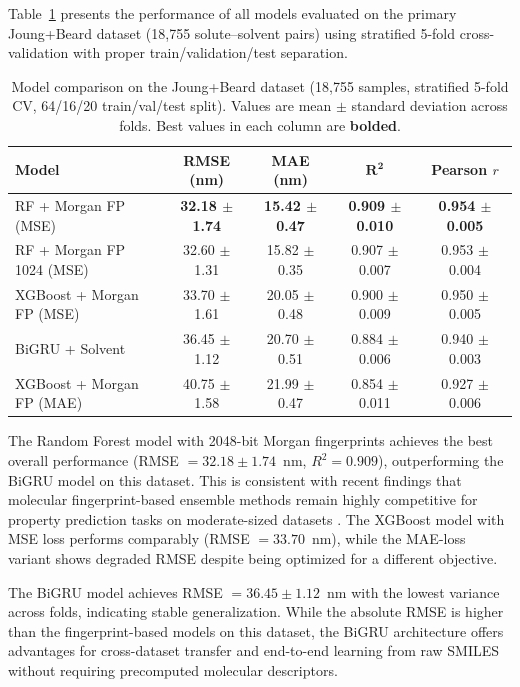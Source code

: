 \documentclass[11pt,a4paper]{article}
\begin{document}
Table~\ref{tab:model_comparison} presents the performance of all models evaluated on the primary Joung+Beard dataset (18,755 solute--solvent pairs) using stratified 5-fold cross-validation with proper train/validation/test separation.

\begin{table}[H]
\centering
\caption{Model comparison on the Joung+Beard dataset (18,755 samples, stratified 5-fold CV, 64/16/20 train/val/test split). Values are mean $\pm$ standard deviation across folds. Best values in each column are \textbf{bolded}.}
\label{tab:model_comparison}
\begin{tabular}{lcccc}
\toprule
\textbf{Model} & \textbf{RMSE (nm)} & \textbf{MAE (nm)} & $\mathbf{R^2}$ & \textbf{Pearson $r$} \\
\midrule
RF + Morgan FP (MSE) & \textbf{32.18 $\pm$ 1.74} & \textbf{15.42 $\pm$ 0.47} & \textbf{0.909 $\pm$ 0.010} & \textbf{0.954 $\pm$ 0.005} \\
RF + Morgan FP 1024 (MSE) & 32.60 $\pm$ 1.31 & 15.82 $\pm$ 0.35 & 0.907 $\pm$ 0.007 & 0.953 $\pm$ 0.004 \\
XGBoost + Morgan FP (MSE) & 33.70 $\pm$ 1.61 & 20.05 $\pm$ 0.48 & 0.900 $\pm$ 0.009 & 0.950 $\pm$ 0.005 \\
BiGRU + Solvent & 36.45 $\pm$ 1.12 & 20.70 $\pm$ 0.51 & 0.884 $\pm$ 0.006 & 0.940 $\pm$ 0.003 \\
XGBoost + Morgan FP (MAE) & 40.75 $\pm$ 1.58 & 21.99 $\pm$ 0.47 & 0.854 $\pm$ 0.011 & 0.927 $\pm$ 0.006 \\
\bottomrule
\end{tabular}
\end{table}

The Random Forest model with 2048-bit Morgan fingerprints achieves the best overall performance (RMSE $= 32.18 \pm 1.74$~nm, $R^2 = 0.909$), outperforming the BiGRU model on this dataset. This is consistent with recent findings that molecular fingerprint-based ensemble methods remain highly competitive for property prediction tasks on moderate-sized datasets \cite{wu2018moleculenet}. The XGBoost model with MSE loss performs comparably (RMSE $= 33.70$~nm), while the MAE-loss variant shows degraded RMSE despite being optimized for a different objective.

The BiGRU model achieves RMSE $= 36.45 \pm 1.12$~nm with the lowest variance across folds, indicating stable generalization. While the absolute RMSE is higher than the fingerprint-based models on this dataset, the BiGRU architecture offers advantages for cross-dataset transfer and end-to-end learning from raw SMILES without requiring precomputed molecular descriptors.
\end{document}
